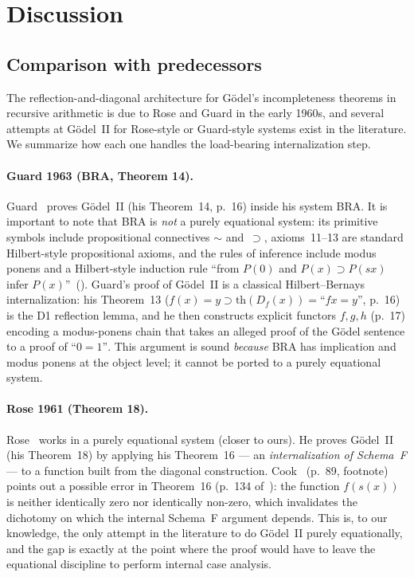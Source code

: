 \documentclass[11pt]{article}
\begin{document}
\section{Discussion}

\subsection*{Comparison with predecessors}

The reflection-and-diagonal architecture for G\"odel's
incompleteness theorems in recursive arithmetic is due to Rose
and Guard in the early 1960s, and several attempts at
G\"odel~II for Rose-style or Guard-style systems exist in the
literature.  We summarize how each one handles the load-bearing
internalization step.

\paragraph{Guard 1963 (BRA, Theorem 14).}
Guard~\cite{guard1963} proves G\"odel~II (his Theorem~14,
p.~16) inside his system BRA.  It is important to note that
BRA is \emph{not} a purely equational system: its primitive
symbols include propositional connectives $\sim$ and~$\supset$,
axioms~11--13 are standard Hilbert-style propositional axioms,
and the rules of inference include modus ponens and a
Hilbert-style induction rule ``from $P(0)$ and $P(x) \supset
P(sx)$ infer $P(x)$''~(\cite[p.~10]{guard1963}).  Guard's proof
of G\"odel~II is a classical Hilbert--Bernays internalization:
his Theorem~13 ($f(x) = y \supset \mathrm{th}(D_f(x)) =
\text{``}fx{=}y\text{''}$, p.~16) is the D1 reflection lemma,
and he then constructs explicit functors $f, g, h$ (p.~17)
encoding a modus-ponens chain that takes an alleged proof of
the G\"odel sentence to a proof of $\text{``}0{=}1\text{''}$.
This argument is sound \emph{because} BRA has implication and
modus ponens at the object level; it cannot be ported to a
purely equational system.

\paragraph{Rose 1961 (Theorem 18).}
Rose~\cite{rose1961} works in a purely equational system
(closer to ours).  He proves G\"odel~II (his Theorem~18)
by applying his Theorem~16 --- an \emph{internalization of
Schema~F} --- to a function built from the diagonal
construction.  Cook~\cite{cook1975} (p.~89, footnote)
points out a possible error in Theorem~16
(p.~134 of~\cite{rose1961}): the function $f(s(x))$
is neither identically zero nor identically non-zero,
which invalidates the dichotomy on which the internal
Schema~F argument depends.  This is, to our knowledge,
the only attempt in the literature to do G\"odel~II
purely equationally, and the gap is exactly at the
point where the proof would have to leave the equational
discipline to perform internal case analysis.
\end{document}
